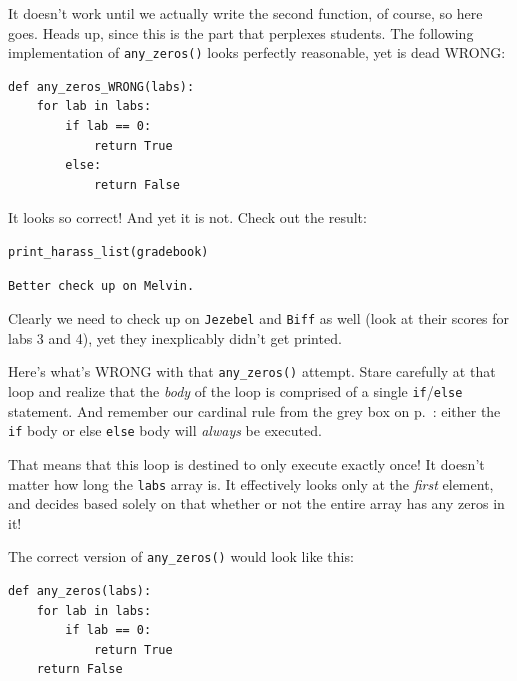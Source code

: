 It doesn't work until we actually write the second function, of course, so here
goes. Heads up, since this is the part that perplexes students. The following
implementation of \texttt{any\_zeros()} looks perfectly reasonable, yet is dead
WRONG:

\begin{Verbatim}[fontsize=\small,samepage=true,frame=single,framesep=3mm]
def any_zeros_WRONG(labs):
    for lab in labs:
        if lab == 0:
            return True
        else:
            return False
\end{Verbatim}

It looks so correct! And yet it is not. Check out the result:

\begin{Verbatim}[fontsize=\small,samepage=true,frame=single,framesep=3mm]
print_harass_list(gradebook)
\end{Verbatim}
\vspace{-.2in}

\begin{Verbatim}[fontsize=\small,samepage=true,frame=leftline,framesep=5mm,framerule=1mm]
Better check up on Melvin.
\end{Verbatim}

Clearly we need to check up on \texttt{Jezebel} and \texttt{Biff} as well (look
at their scores for labs 3 and 4), yet they inexplicably didn't get printed.


Here's what's WRONG with that \texttt{any\_zeros()} attempt. Stare carefully at
that loop and realize that the \textit{body} of the loop is comprised of a
single \texttt{if}/\texttt{else} statement. And remember our cardinal rule from
the grey box on p.~\pageref{cardinalRule}: either the \texttt{if} body or else
\texttt{else} body will \textit{always} be executed.

That means that this loop is destined to only execute exactly once! It doesn't
matter how long the \texttt{labs} array is. It effectively looks only at the
\textit{first} element, and decides based solely on that whether or not the
entire array has any zeros in it!

The correct version of \texttt{any\_zeros()} would look like this:

\begin{Verbatim}[fontsize=\small,samepage=true,frame=single,framesep=3mm]
def any_zeros(labs):
    for lab in labs:
        if lab == 0:
            return True
    return False
\end{Verbatim}

